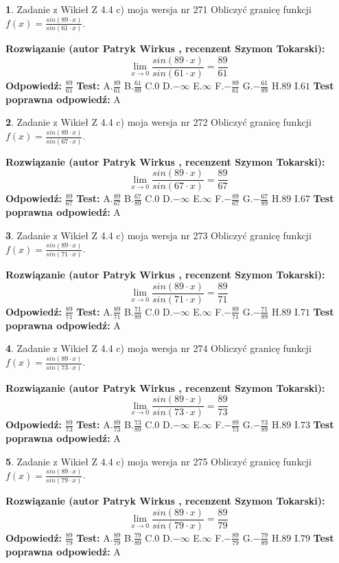 \documentclass[12pt, a4paper]{article}
\theoremstyle{definition} %
\newtheorem{zad}{}
\newcommand{\zadStart}[1]{\begin{zad}#1\newline}
\newcommand{\zadStop}{\end{zad}}
\newcommand{\rozwStart}[2]{\noindent \textbf{Rozwiązanie (autor #1 , recenzent #2): }\newline}
\newcommand{\rozwStop}{\newline}
\newcommand{\odpStart}{\noindent \textbf{Odpowiedź:}\newline}
\newcommand{\odpStop}{\newline}
\newcommand{\testStart}{\noindent \textbf{Test:}\newline}
\newcommand{\testStop}{\newline}
\newcommand{\kluczStart}{\noindent \textbf{Test poprawna odpowiedź:}\newline}
\newcommand{\kluczStop}{\newline}
\begin{document}
\zadStart{Zadanie z Wikieł Z 4.4 c) moja wersja nr 271}
Obliczyć granicę funkcji $f(x)=\frac{sin(89\cdot x)}{sin(61\cdot x)}$.
\zadStop
\rozwStart{Patryk Wirkus}{Szymon Tokarski}
$$\lim\limits_{x\to 0}\frac{sin(89\cdot x)}{sin(61\cdot x)}=
\frac{89}{61}$$
\rozwStop
\odpStart
$\frac{89}{61}$
\odpStop
\testStart
A.$\frac{89}{61}$
B.$\frac{61}{89}$
C.$0$
D.$-\infty$
E.$\infty$
F.$-\frac{89}{61}$
G.$-\frac{61}{89}$
H.$89$
I.$61$
\testStop
\kluczStart
A
\kluczStop



\zadStart{Zadanie z Wikieł Z 4.4 c) moja wersja nr 272}
Obliczyć granicę funkcji $f(x)=\frac{sin(89\cdot x)}{sin(67\cdot x)}$.
\zadStop
\rozwStart{Patryk Wirkus}{Szymon Tokarski}
$$\lim\limits_{x\to 0}\frac{sin(89\cdot x)}{sin(67\cdot x)}=
\frac{89}{67}$$
\rozwStop
\odpStart
$\frac{89}{67}$
\odpStop
\testStart
A.$\frac{89}{67}$
B.$\frac{67}{89}$
C.$0$
D.$-\infty$
E.$\infty$
F.$-\frac{89}{67}$
G.$-\frac{67}{89}$
H.$89$
I.$67$
\testStop
\kluczStart
A
\kluczStop



\zadStart{Zadanie z Wikieł Z 4.4 c) moja wersja nr 273}
Obliczyć granicę funkcji $f(x)=\frac{sin(89\cdot x)}{sin(71\cdot x)}$.
\zadStop
\rozwStart{Patryk Wirkus}{Szymon Tokarski}
$$\lim\limits_{x\to 0}\frac{sin(89\cdot x)}{sin(71\cdot x)}=
\frac{89}{71}$$
\rozwStop
\odpStart
$\frac{89}{71}$
\odpStop
\testStart
A.$\frac{89}{71}$
B.$\frac{71}{89}$
C.$0$
D.$-\infty$
E.$\infty$
F.$-\frac{89}{71}$
G.$-\frac{71}{89}$
H.$89$
I.$71$
\testStop
\kluczStart
A
\kluczStop



\zadStart{Zadanie z Wikieł Z 4.4 c) moja wersja nr 274}
Obliczyć granicę funkcji $f(x)=\frac{sin(89\cdot x)}{sin(73\cdot x)}$.
\zadStop
\rozwStart{Patryk Wirkus}{Szymon Tokarski}
$$\lim\limits_{x\to 0}\frac{sin(89\cdot x)}{sin(73\cdot x)}=
\frac{89}{73}$$
\rozwStop
\odpStart
$\frac{89}{73}$
\odpStop
\testStart
A.$\frac{89}{73}$
B.$\frac{73}{89}$
C.$0$
D.$-\infty$
E.$\infty$
F.$-\frac{89}{73}$
G.$-\frac{73}{89}$
H.$89$
I.$73$
\testStop
\kluczStart
A
\kluczStop



\zadStart{Zadanie z Wikieł Z 4.4 c) moja wersja nr 275}
Obliczyć granicę funkcji $f(x)=\frac{sin(89\cdot x)}{sin(79\cdot x)}$.
\zadStop
\rozwStart{Patryk Wirkus}{Szymon Tokarski}
$$\lim\limits_{x\to 0}\frac{sin(89\cdot x)}{sin(79\cdot x)}=
\frac{89}{79}$$
\rozwStop
\odpStart
$\frac{89}{79}$
\odpStop
\testStart
A.$\frac{89}{79}$
B.$\frac{79}{89}$
C.$0$
D.$-\infty$
E.$\infty$
F.$-\frac{89}{79}$
G.$-\frac{79}{89}$
H.$89$
I.$79$
\testStop
\kluczStart
A
\kluczStop
\end{document}
